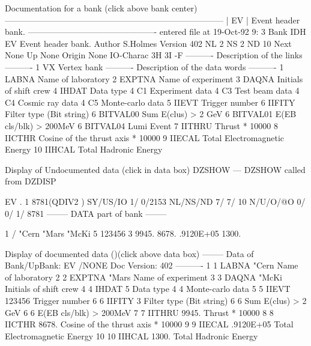 \begin{XMPt}{Documentation for a bank (click above bank center)}
------------------------------------------------------------------------------
| EV   | Event header bank.
 ---------------------------------------------- entered file at 19-Oct-92  9: 3
 Bank IDH  EV       Event header bank.
 Author             S.Holmes
 Version            402
 NL               2
 NS               2
 ND              10
 Next      None
 Up        None
 Origin    None
 IO-Charac          3H 3I -F
              ---------- Description of the links  ----------
 1         VX       Vertex bank
              ---------- Description of the data words   ----------
 1         LABNA    Name of laboratory
 2         EXPTNA   Name of experiment
 3         DAQNA    Initials of shift crew
 4         IHDAT    Data type
 4         C1       Experiment data
 4         C3       Test beam data
 4         C4       Cosmic ray data
 4         C5       Monte-carlo data
 5         IIEVT    Trigger number
 6         IIFITY   Filter type (Bit string)
 6         BITVAL00 Sum E(clus) > 2 GeV
 6         BITVAL01 E(EB cls/blk) > 200MeV
 6         BITVAL04 Lumi Event
 7         IITHRU   Thrust * 10000
 8         IICTHR   Cosine of the thrust axis * 10000
 9         IIECAL   Total Electromagnetic Energy
 10        IIHCAL   Total Hadronic Energy
\end{XMPt}
 
\newpage
 
\begin{XMPt}{Display of Undocumented data (click in data box)}
 DZSHOW ---  DZSHOW called from DZDISP
 
EV  .     1     8781(QDIV2   ) SY/US/IO    1/    0/2153 
NL/NS/ND    7/    7/      10 N/U/O/@O       0/       0/       1/
   8781
 --------  DATA part of bank  --------
 
       1 /       "Cern       "Mars       "McKi           5      123456
                         3   9945.       8678.       .9120E+05   1300.
\end{XMPt}
 
\bigskip
 
\begin{XMPt}{Display of documented data ()(click above data box)}
 -------- Data of Bank/UpBank: EV  /NONE Doc Version: 402 ----------
     1    1  LABNA          "Cern  Name of laboratory
     2    2  EXPTNA         "Mars  Name of experiment
     3    3  DAQNA          "McKi  Initials of shift crew
     4    4  IHDAT              5  Data type
     4    4                        Monte-carlo data
     5    5  IIEVT         123456  Trigger number
     6    6  IIFITY             3  Filter type (Bit string)
     6    6                        Sum E(clus) > 2 GeV
     6    6                        E(EB cls/blk) > 200MeV
     7    7  IITHRU     9945.      Thrust * 10000
     8    8  IICTHR     8678.      Cosine of the thrust axis * 10000
     9    9  IIECAL     .9120E+05  Total Electromagnetic Energy
    10   10  IIHCAL     1300.      Total Hadronic Energy
\end{XMPt}
 
